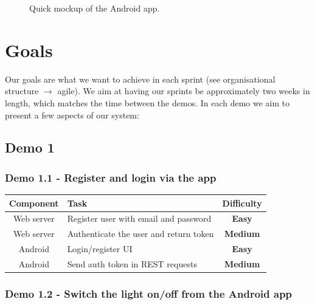 \documentclass[onecolumn]{IEEEtran}
\newcommand{\easy}{{\color{green} \textbf{Easy}}}
\newcommand{\medium}{{\color{orange} \textbf{Medium}}}
\begin{document}
\begin{figure}[H]
\begin{subfigure}{.33\textwidth}
    \end{subfigure}
    \caption{Quick mockup of the Android app.}
    \label{fig:fig}
\end{figure}

\section{Goals}

Our goals are what we want to achieve in each sprint (see organisational structure $\rightarrow$ agile). We aim at having our sprints be approximately two weeks in length, which matches the time between the demos. In each demo we aim to present a few aspects of our system:

\subsection{Demo 1}

\subsubsection{Demo 1.1 - Register and login via the app}

\begin{center}
    \begin{tabularx}{0.8\linewidth}{|c|L|c|}
        \hline
        \textbf{Component} & \textbf{Task} & \textbf{Difficulty} \\
        \hline
        Web server & Register user with email and password & \easy \\
        \hline
        Web server & Authenticate the user and return token & \medium \\
        \hline
        Android & Login/register UI & \easy \\
        \hline
        Android & Send auth token in REST requests & \medium \\
        \hline
    \end{tabularx}
\end{center}

\subsubsection{Demo 1.2 - Switch the light on/off from the Android app}
\end{document}
